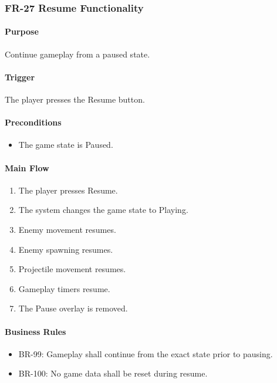 \documentclass[11pt,a4paper]{article}
\begin{document}
\subsubsection{FR-27 Resume Functionality}

\paragraph{Purpose}
Continue gameplay from a paused state.

\paragraph{Trigger}
The player presses the Resume button.

\paragraph{Preconditions}
\begin{itemize}
  \item The game state is Paused.
\end{itemize}

\paragraph{Main Flow}
\begin{enumerate}
  \item The player presses Resume.
  \item The system changes the game state to Playing.
  \item Enemy movement resumes.
  \item Enemy spawning resumes.
  \item Projectile movement resumes.
  \item Gameplay timers resume.
  \item The Pause overlay is removed.
\end{enumerate}

\paragraph{Business Rules}
\begin{itemize}
  \item BR-99: Gameplay shall continue from the exact state prior to pausing.
  \item BR-100: No game data shall be reset during resume.
\end{itemize}
\end{document}
